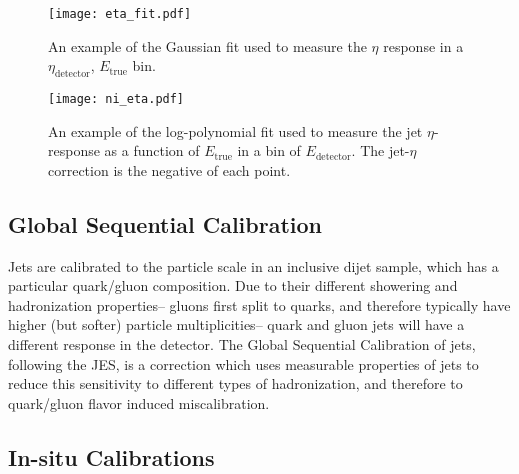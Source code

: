 
\begin{figure}
\centering
\texttt{[image: eta\_fit.pdf]}
\label{fig:jet-reconstruction:eta-fit}
\caption{An example of the Gaussian fit used to measure the $\eta$ response in a $\eta_\mathrm{detector}$, $E_\mathrm{true}$ bin.}
\end{figure}



\begin{figure}
\centering
\texttt{[image: ni\_eta.pdf]}
\label{fig:jet-reconstruction:e-fit}
\caption{An example of the log-polynomial fit used to measure the jet $\eta$-response as a function of $E_\mathrm{true}$ in a bin of $E_\mathrm{detector}$. The jet-$\eta$ correction is the negative of each point.}
\end{figure}





\subsection{Global Sequential Calibration}

Jets are calibrated to the particle scale in an inclusive dijet sample, which has a particular quark/gluon composition. Due to their different showering and hadronization properties-- gluons first split to quarks, and therefore typically have higher (but softer) particle multiplicities-- quark and gluon jets will have a different response in the detector. The Global Sequential Calibration of jets, following the JES, is a correction which uses measurable properties of jets to reduce this sensitivity to different types of hadronization, and therefore to quark/gluon flavor induced miscalibration.



\subsection{In-situ Calibrations}


